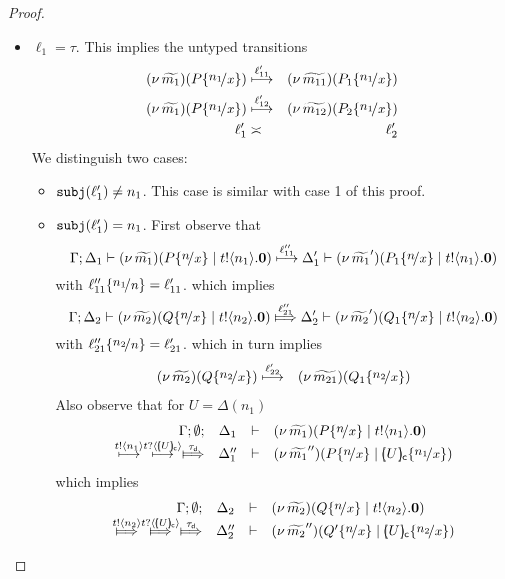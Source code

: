 \begin{proof}
\begin{enumerate}
\begin{itemize}
					\item	$\ell_1 = \tau$. This implies the untyped transitions
							\begin{eqnarray}
								\newsp{\widetilde{m_1}}{P \subst{n_1}{x}} &\hby{\ell_{11}'}& \newsp{\widetilde{m_{11}}}{P_1 \subst{n_1}{x}}
								\label{lem:tr_app_41}\\
								\newsp{\widetilde{m_1}}{P \subst{n_1}{x}} &\hby{\ell_{12}'}& \newsp{\widetilde{m_{12}}}{P_2 \subst{n_1}{x}}
								\label{lem:tr_app_42}\\
								\ell_1' &\asymp& \ell_2'
							\end{eqnarray}
							We distinguish two cases:
							\begin{itemize}
								\item	$\mathtt{subj}(\ell_1') \not= n_1$. This case is similar with case 1 of this proof.
								\item	$\mathtt{subj}(\ell_1') = n_1$.
										First observe that
										\[
											\horel{\Gamma}{\Delta_1}{\newsp{\widetilde{m_1}}{P \subst{n}{x} \Par \bout{t}{n_1} \inact}}
											{ \hby{\ell_{11}''} }
											{\Delta_1'}{\newsp{\widetilde{m_1}'}{P_1 \subst{n}{x} \Par \bout{t}{n_1} \inact}}
										\]
										with $\ell_{11}'' \subst{n_1}{n}  = \ell_{11}' $.
										which implies
										\[
											\horel{\Gamma}{\Delta_2}{\newsp{\widetilde{m_2}}{Q \subst{n}{x} \Par \bout{t}{n_2} \inact}}
											{ \Hby{\ell_{21}''} }
											{\Delta_2'}{\newsp{\widetilde{m_2}'}{Q_1 \subst{n}{x} \Par \bout{t}{n_2} \inact}}
										\]
										with $\ell_{21}'' \subst{n_2}{n}  = \ell_{21}' $.
										which in turn implies
										\begin{eqnarray}
											\newsp{\widetilde{m_2}}{Q \subst{n_2}{x}} &\hby{\ell_{22}'}& \newsp{\widetilde{m_{21}}}{Q_1 \subst{n_2}{x}}
											\label{lem:tr_app_43}
										\end{eqnarray}
										Also observe that for $U = \Delta(n_1)$
										\[
											\mhorel{\Gamma}{\Delta_1}{\newsp{\widetilde{m_1}}{P \subst{n}{x} \Par \bout{t}{n_1} \inact}}
											{ \hby{\bactout{t}{n_1}} \hby{\bactinp{t}{\omapchar{U}}} \Hby{\dtau} }
											{\Delta_1''}{}{\newsp{\widetilde{m_1}''}{P \subst{n}{x} \Par \omapchar{U} \subst{n_1}{x}}}
										\]
										which implies
										\[
											\mhorel{\Gamma}{\Delta_2}{\newsp{\widetilde{m_2}}{Q \subst{n}{x} \Par \bout{t}{n_2} \inact}}
											{ \Hby{\bactout{t}{n_2}} \Hby{\bactinp{t}{\omapchar{U}}} \Hby{\dtau} }
											{\Delta_2''}{}{\newsp{\widetilde{m_2}''}{Q' \subst{n}{x} \Par \omapchar{U} \subst{n_2}{x}}}
\]
\end{itemize}
\end{itemize}
\end{enumerate}
\end{proof}
